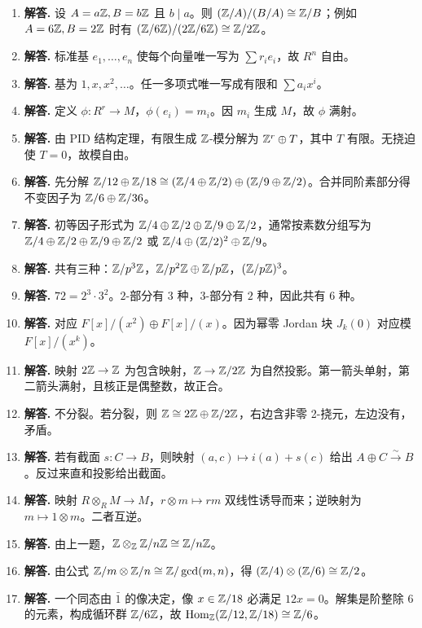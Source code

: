 \begin{enumerate}[label=\textbf{\arabic*.}, leftmargin=*, itemsep=1em]
$(2\Z+3\Z)/3\Z\cong \Z/3\Z$，而 $2\Z/(2\Z\cap3\Z)=2\Z/6\Z\cong \Z/3\Z$。同构由第二同构定理给出。
\item \textbf{解答.} 设 $A=a\mathbb{Z},B=b\mathbb{Z}$ 且 $b\mid a$。则 $(\mathbb{Z}/A)/(B/A)\cong \mathbb{Z}/B$；例如 $A=6\mathbb{Z},B=2\mathbb{Z}$ 时有 $(\mathbb{Z}/6\mathbb{Z})/(2\mathbb{Z}/6\mathbb{Z})\cong \mathbb{Z}/2\mathbb{Z}$。
\item \textbf{解答.} 标准基 $e_1,\dots,e_n$ 使每个向量唯一写为 $\sum r_ie_i$，故 $R^n$ 自由。
\item \textbf{解答.} 基为 $1,x,x^2,\dots$。任一多项式唯一写成有限和 $\sum a_ix^i$。
\item \textbf{解答.} 定义 $\phi:R^r\to M$，$\phi(e_i)=m_i$。因 $m_i$ 生成 $M$，故 $\phi$ 满射。
\item \textbf{解答.} 由 PID 结构定理，有限生成 $\mathbb{Z}$-模分解为 $\mathbb{Z}^r\oplus T$，其中 $T$ 有限。无挠迫使 $T=0$，故模自由。
\item \textbf{解答.} 先分解 $\mathbb{Z}/12\oplus \mathbb{Z}/18\cong (\mathbb{Z}/4\oplus \mathbb{Z}/2)\oplus(\mathbb{Z}/9\oplus \mathbb{Z}/2)$。合并同阶素部分得不变因子为 $\mathbb{Z}/6\oplus \mathbb{Z}/36$。
\item \textbf{解答.} 初等因子形式为 $\mathbb{Z}/4\oplus \mathbb{Z}/2\oplus \mathbb{Z}/9\oplus \mathbb{Z}/2$，通常按素数分组写为 $\mathbb{Z}/4\oplus \mathbb{Z}/2\oplus \mathbb{Z}/9\oplus \mathbb{Z}/2$ 或 $\mathbb{Z}/4\oplus (\mathbb{Z}/2)^2\oplus \mathbb{Z}/9$。
\item \textbf{解答.} 共有三种：$\mathbb{Z}/p^3\mathbb{Z}$，$\mathbb{Z}/p^2\mathbb{Z}\oplus \mathbb{Z}/p\mathbb{Z}$，$(\mathbb{Z}/p\mathbb{Z})^3$。
\item \textbf{解答.} $72=2^3\cdot 3^2$。$2$-部分有 $3$ 种，$3$-部分有 $2$ 种，因此共有 $6$ 种。
\item \textbf{解答.} 对应 $F[x]/(x^2)\oplus F[x]/(x)$。因为幂零 Jordan 块 $J_k(0)$ 对应模 $F[x]/(x^k)$。
\item \textbf{解答.} 映射 $2\mathbb{Z}\to \mathbb{Z}$ 为包含映射，$\mathbb{Z}\to \mathbb{Z}/2\mathbb{Z}$ 为自然投影。第一箭头单射，第二箭头满射，且核正是偶整数，故正合。
\item \textbf{解答.} 不分裂。若分裂，则 $\mathbb{Z}\cong 2\mathbb{Z}\oplus \mathbb{Z}/2\mathbb{Z}$，右边含非零 2-挠元，左边没有，矛盾。
\item \textbf{解答.} 若有截面 $s:C\to B$，则映射 $(a,c)\mapsto i(a)+s(c)$ 给出 $A\oplus C\xrightarrow{\sim} B$。反过来直和投影给出截面。
\item \textbf{解答.} 映射 $R\otimes_R M\to M$，$r\otimes m\mapsto rm$ 双线性诱导而来；逆映射为 $m\mapsto 1\otimes m$。二者互逆。
\item \textbf{解答.} 由上一题，$\mathbb{Z}\otimes_{\mathbb{Z}} \mathbb{Z}/n\mathbb{Z}\cong \mathbb{Z}/n\mathbb{Z}$。
\item \textbf{解答.} 由公式 $\mathbb{Z}/m\otimes \mathbb{Z}/n\cong \mathbb{Z}/\gcd(m,n)$，得 $(\mathbb{Z}/4)\otimes(\mathbb{Z}/6)\cong \mathbb{Z}/2$。
\item \textbf{解答.} 一个同态由 $\bar1$ 的像决定，像 $x\in \mathbb{Z}/18$ 必满足 $12x=0$。解集是阶整除 $6$ 的元素，构成循环群 $\mathbb{Z}/6\mathbb{Z}$，故 $\mathrm{Hom}_{\mathbb{Z}}(\mathbb{Z}/12,\mathbb{Z}/18)\cong \mathbb{Z}/6$。

\end{enumerate}
